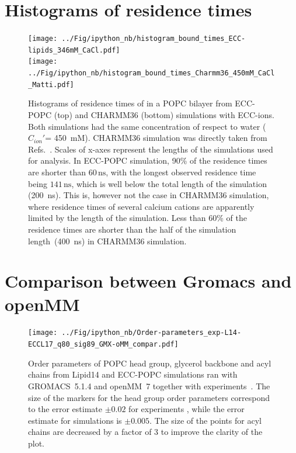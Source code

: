 \documentclass[journal=jpcbfk]{achemso}
\begin{document}
\newpage
\section{Histograms of residence times}

\begin{figure}[!h]
  \centering
  \texttt{[image: ../Fig/ipython\_nb/histogram\_bound\_times\_ECC-lipids\_346mM\_CaCl.pdf]} \\
  \texttt{[image: ../Fig/ipython\_nb/histogram\_bound\_times\_Charmm36\_450mM\_CaCl\_Matti.pdf]}
  \caption{\label{fig:hist_residence_times}
   Histograms of residence times of  in a POPC bilayer
   from ECC-POPC (top) and CHARMM36 (bottom) simulations with ECC-ions.
   Both simulations had the same concentration of  respect to water ($C_{ion}'$= 450~mM).
   CHARMM36 simulation was directly taken from Refs.~.
   Scales of x-axes represent the lengths of the simulations used for analysis.
   In ECC-POPC simulation, 90\% of the residence times are
   shorter than $60\,\mathrm{ns}$, %
   with the longest observed residence time being $141\,\mathrm{ns}$,
   which is well below the total length of the simulation (200~ns).
   This is, however not the case in CHARMM36 simulation,
   where residence times of several calcium cations are    
   apparently limited by the length of the simulation.
   Less than 60\% of the residence times are
   shorter than the half of the simulation length~(400~ns)
   in CHARMM36 simulation.
  }
\end{figure}

\newpage
\section{Comparison between Gromacs and openMM}

\begin{figure}[!h]
  \centering
  \texttt{[image: ../Fig/ipython\_nb/Order-parameters\_exp-L14-ECCL17\_q80\_sig89\_GMX-oMM\_compar.pdf]}
  \caption{\label{fig:ordPars_actual_GMX_oMM_compar}
    Order parameters of POPC head group, glycerol backbone and acyl chains 
    from Lipid14 \cite{dickson14} and ECC-POPC simulations ran
    with GROMACS~5.1.4 \cite{Abraham15} and openMM~7 \cite{openmm7} 
    together with experiments~\cite{ferreira13}.
    The size of the markers for the head group order parameters correspond to
    the error estimate $\pm 0.02$ for experiments \cite{botan15,ollila16},
    while the error estimate for simulations is $\pm 0.005$.
    The size of the points for acyl chains are decreased by a factor of 3 to improve the clarity of the plot.
  }
\end{figure}
\end{document}
